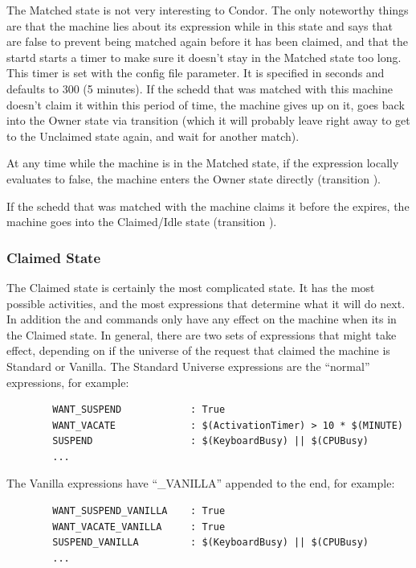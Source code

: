 The Matched state is not very interesting to Condor.  The only
noteworthy things are that the machine lies about its 
expression while in this state and says that  are
false to prevent being matched again before it has been claimed, and
that the startd starts a timer to make sure it doesn't stay in the
Matched state too long.  This timer is set with the
 \label{param:MatchTimeout} config file
parameter.  It is specified in seconds and defaults to 300 (5
minutes).  If the schedd that was matched with this machine doesn't
claim it within this period of time, the machine gives up on it, goes
back into the Owner state via transition  (which it will
probably leave right away to get to the Unclaimed state again, and
wait for another match). 

At any time while the machine is in the Matched state, if the
 expression locally evaluates to false, the machine enters
the Owner state directly (transition ).

If the schedd that was matched with the machine claims it before the
 expires, the machine goes into the Claimed/Idle
state (transition ).

\subsubsection{\label{sec:Claimed-State}Claimed State}

The Claimed state is certainly the most complicated state.
It has the most possible activities, and the most expressions that
determine what it will do next.
In addition the  and  commands only
have any effect on the machine when its in the Claimed state.
In general, there are two sets of expressions that might take effect,
depending on if the universe of the request that claimed the machine is
Standard or Vanilla.
The Standard Universe expressions are the ``normal'' expressions, for
example:
\begin{verbatim}
        WANT_SUSPEND            : True
        WANT_VACATE             : $(ActivationTimer) > 10 * $(MINUTE)
        SUSPEND                 : $(KeyboardBusy) || $(CPUBusy)
        ...
\end{verbatim}

The Vanilla expressions have ``\_VANILLA'' appended to the end, for
example:
\begin{verbatim}
        WANT_SUSPEND_VANILLA    : True
        WANT_VACATE_VANILLA     : True
        SUSPEND_VANILLA         : $(KeyboardBusy) || $(CPUBusy)
        ...
\end{verbatim}

